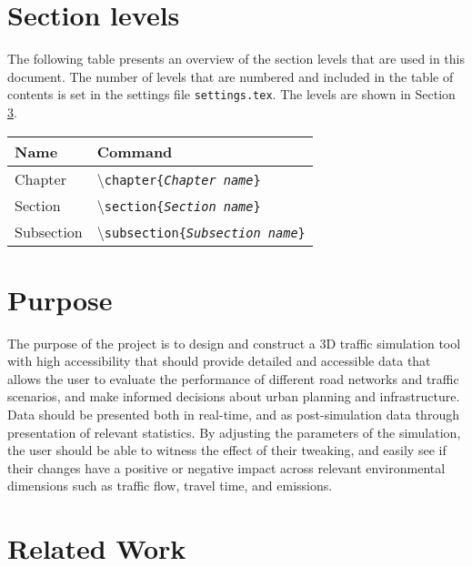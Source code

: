 
\section{Section levels}
The following table presents an overview of the section levels that are used in this document. The number of levels that are numbered and included in the table of contents is set in the settings file \texttt{settings.tex}. The levels are shown in Section \ref{Section_ref}.

\begin{table}[H]
\centering
\begin{tabular}{ll} \hline\hline
Name & Command\\ \hline
Chapter & \textbackslash\texttt{chapter\{\emph{Chapter name}\}}\\
Section & \textbackslash\texttt{section\{\emph{Section name}\}}\\
Subsection & \textbackslash\texttt{subsection\{\emph{Subsection name}\}}\\
\end{tabular}
\end{table}


\section{Purpose}
The purpose of the project is to design and construct a 3D traffic simulation tool with high accessibility that should provide detailed and accessible data that allows the user to evaluate the performance of different road networks and traffic scenarios, and make informed decisions about urban planning and infrastructure. Data should be presented both in real-time, and as post-simulation data through presentation of relevant statistics. By adjusting the parameters of the simulation, the user should be able to witness the effect of their tweaking, and easily see if their changes have a positive or negative impact across relevant environmental dimensions such as traffic flow, travel time, and emissions. 


\section{Related Work} \label{Section_ref}

